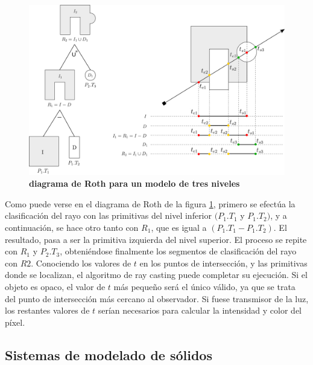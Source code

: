 \begin{figure}[!]
\includegraphics[width=15cm]{Img/GEO/ray3.png}
\centering
\caption{\textbf{\footnotesize{diagrama de Roth para un modelo de tres niveles}}}
\label{fig:visual3}
\end{figure}

Como puede verse en el diagrama de Roth de la figura \ref{fig:visual3}, primero se efectúa la clasificación del rayo con las primitivas del nivel inferior $(P_1.T_1$ y $P_1.T_2)$, y a continuación, se hace otro tanto con $R_1$, que es igual a $(P_1.T_1 - P_1.T_2)$. El resultado, pasa a ser la primitiva izquierda del nivel superior. El proceso se repite con $R_1$ y $P_2.T_3$, obteniéndose finalmente los segmentos de clasificación del rayo con $R2$. Conociendo los valores de $t$ en los puntos de intersección, y las primitivas donde se localizan, el algoritmo de ray casting puede completar su ejecución. Si el objeto es opaco, el valor de $t$ más pequeño será el único válido, ya que se trata del punto de intersección más cercano al observador. Si fuese transmisor de la luz, los restantes valores de $t$ serían necesarios para calcular la intensidad y color del píxel.


\clearpage
\subsection{Sistemas de modelado de sólidos }

